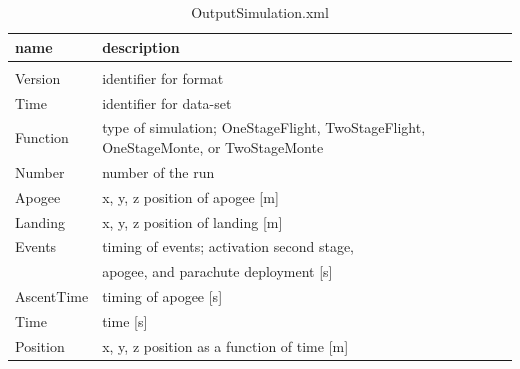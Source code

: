 \documentclass[11pt, a4paper]{article}
\begin{document}
\begin{table}
  \centering
  \caption{OutputSimulation.xml}
  \label{tab:output_simulation_xml}
  \begin{tabular}{l p{8cm}}
    \textbf{name} & \textbf{description} \\
    \hline \\
    Version & identifier for format \\
    Time & identifier for data-set \\
    Function & type of simulation; OneStageFlight, TwoStageFlight,  OneStageMonte, or TwoStageMonte \\
    Number & number of the run \\
    Apogee & x, y, z position of apogee [m] \\
    Landing & x, y, z position of landing [m] \\
    Events & timing of events; activation second stage,  \\
     & apogee, and parachute deployment [s] \\
    AscentTime & timing of apogee [s] \\
    Time & time [s] \\
    Position & x, y, z position as a function of time [m] \\
  \end{tabular}
\end{table}
\end{document}
